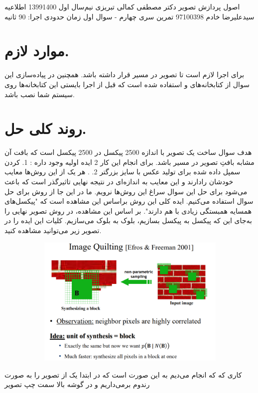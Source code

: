 \documentclass[a4paper,12pt]{article}
\begin{document}
\handout
{اصول پردازش تصویر}
{دکتر مصطفی کمالی تبریزی}
{نیم‌سال اول 1399\lr{-}1400}
{اطلاعیه}
{سیدعلیرضا خادم}
{97100398}
{تمرین سری چهارم - سوال اول}
زمان حدودی اجرا: 90 ثانیه
\section*{موارد لازم.}
برای اجرا لازم است تا تصویر 
در مسیر
قرار داشته باشد. همچنین در پیاده‌سازی این سوال از کتابخانه‌های 
و
استفاده شده است که قبل از اجرا بایستی این کتابخانه‌ها روی سیستم شما نصب باشد.
\section*{روند کلی حل.}
هدف سوال ساخت یک تصویر با اندازه 2500 پیکسل در 2500 پیکسل است که بافت آن مشابه بافتِ تصویر 
در مسیر
باشد. برای انجام این کار 2 ایده اولیه وجود داره : 1. 
کردن سمپل داده شده برای تولید عکس با سایز بزرگتر 2. 
.
هر یک از این روش‌ها معایب خودشان رادارند و این معایب به اندازه‌ای در نتیجه نهایی تاثیرگذر  است که باعث می‌شود برای حل این سوال سراغ این روش‌ها نرویم. ما در این جا از روش 
برای حل سوال استفاده می‌کنیم. ایده ‌کلی این روش براساس این مشاهده است که "پیکسل‌های همسایه همبستگی زیادی با هم دارند". ‌بر اساس این مشاهده، در روش 
تصویر نهایی را به‌جای این که پیکسل به پیکسل بسازیم، بلوک به بلوک می‌سازیم. کلیات این ایده را در تصویر زیر می‌توانید مشاهده کنید.
\begin{figure}[H]
	\centering
	\begin{subfigure}{0.8\textwidth}
		\centering
		\includegraphics[width=.7\textwidth]{1.png}
	\end{subfigure}
\end{figure}
کاری که که انجام می‌دیم به این صورت است که در ابتدا یک 
از تصویر 
را به صورت رندوم بر‌می‌داریم و در گوشه بالا سمت چپ تصویر 
\end{document}
